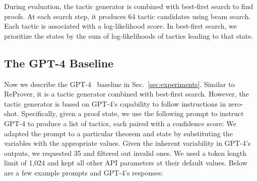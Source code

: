 \documentclass{article}
\newcommand\name{ReProver}
\begin{document}
During evaluation, the tactic generator is combined with best-first search to find proofs. At each search step, it produces 64 tactic candidates using beam search. Each tactic is associated with a log-likelihood score. In best-first search, we prioritize the states by the sum of log-likelihoods of tactics leading to that state. 


\subsection{The GPT-4 Baseline}
\label{appendix:gpt-4}

Now we describe the GPT-4~\cite{openai2023gpt4} baseline in Sec.~\ref{sec:experiments}. Similar to {\name}, it is a tactic generator combined with best-first search. However, the tactic generator is based on GPT-4's capability to follow instructions in zero-shot. Specifically, given a proof state, we use the following prompt to instruct GPT-4 to produce a list of tactics, each paired with a confidence score:
{
\setlength{\fboxsep}{0.8em}
\noindent{}
}
We adapted the prompt to a particular theorem and state by substituting the variables with the appropriate values. Given the inherent variability in GPT-4's outputs, we requested 35 and filtered out invalid ones. We used a token length limit of 1,024 and kept all other API parameters at their default values. Below are a few example prompts and GPT-4's responses:
\end{document}
